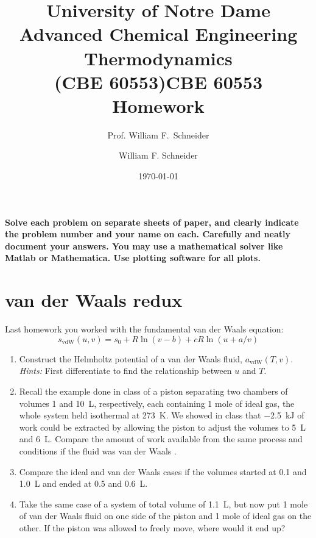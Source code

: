 \documentclass[11pt]{article}
\title{University of Notre Dame\\Advanced Chemical Engineering Thermodynamics\\(CBE 60553)}
\author{Prof. William F.\ Schneider}
\author{William F. Schneider}
\date{\today}
\title{CBE 60553 Homework}
\begin{document}
\begin{OPTIONS}
\end{OPTIONS}

\noindent \textbf{Solve each problem on separate sheets of paper, and clearly indicate the problem number and your name on each.  Carefully and neatly document your answers.  You may use a mathematical solver like Matlab or Mathematica. Use plotting software for all plots.}

\section{van der Waals  redux}
\label{sec:org343edfc}
Last homework you worked with the fundamental van der Waals equation:
\begin{equation}
s_\text{vdW}(u,v)=s_{0}+R\ln\left (v-b\right ) +c R \ln \left ( u+a/v \right )
\end{equation}
\begin{enumerate}
\item Construct the Helmholtz potential of a van der Waals fluid,
\(a_\text{vdW}(T,v)\).  \emph{Hints:} First differentiate to find the
relationship between \(u\) and \(T\).

\item Recall the example done in class of a piston separating two chambers of volumes 1 and
\SI{10}{L}, respectively, each containing 1 mole of ideal gas, the whole system held isothermal at
\SI{273}{K}.  We showed in class that \SI{-2.5}{kJ} of work could be extracted by allowing
the piston to adjust the volumes to \SI{5}{L} and \SI{6}{L}.  Compare the amount of work available
from the same process and conditions if the fluid was van der Waals .

\item Compare the ideal and van der Waals  cases if the volumes started at 0.1 and
\SI{1.0}{L} and ended at 0.5 and \SI{0.6}{L}.

\item Take the same case of a system of total volume of \SI{1.1}{L}, but now put 1 mole of van
der Waals  fluid on one side of the piston and 1 mole of ideal gas on the other.  If
the piston was allowed to freely move, where would it end up?
\end{enumerate}
\end{document}
